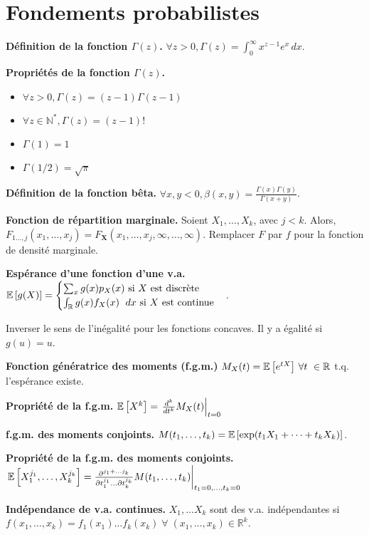\section{Fondements probabilistes}
\textbf{Définition de la fonction $\Gamma(z)$.} $\forall z > 0, \Gamma(z) = \int_0^\infty x^{z-1}e^x \, dx$.

\textbf{Propriétés de la fonction $\Gamma(z)$.}
\begin{itemize}
	\item $\forall z > 0, \Gamma(z) = (z-1)\Gamma(z-1)$
	\item $\forall z \in \mathbb{N}^*, \Gamma(z) = (z-1)!$
	\item $\Gamma(1)=1$
	\item $\Gamma(1/2)=\sqrt{\pi}$
\end{itemize}

\textbf{Définition de la fonction bêta.}  $\forall x,y<0, \beta(x,y)=\frac{\Gamma(x)\Gamma(y)}{\Gamma(x+y)}$.

\textbf{Fonction de répartition marginale.} Soient $X_1, \dots, X_k$, avec $j<k$. Alors, $F_{1\dots,j}(x_1,\dots,x_j) = F_{\mathbf{X}}(x_1,\dots,x_j,\infty, \dots, \infty).$ Remplacer $F$ par $f$ pour la fonction de densité marginale.

\textbf{Espérance d'une fonction d'une v.a.} $\e{g(X)} = 
	\begin{cases}
		\sum_x g(x) p_X(x) \text{ si $X$ est discrète} \\
		\int_\mathbb{R} g(x) f_X(x) \; dx \text{ si $X$ est continue}
	\end{cases}
$.

 Inverser le sens de l'inégalité pour les fonctions concaves. Il y a égalité si $g(u)=u$.


\textbf{Fonction génératrice des moments (f.g.m.)} $M_X(t)=\e{e^{tX}} \, \forall t \in \mathbb{R}$ t.q. l'espérance existe.

\textbf{Propriété de la f.g.m.} $\mathbb{E}\left[{X^k}\right] = \left.\frac{d^k}{dt^k}M_X(t)\right|_{t=0}$

\textbf{f.g.m. des moments conjoints.} $M(t_1,\dots,t_k) = \mathbb{E}\left[{\exp(t_1X_1+\dots+t_kX_k)}\right]$.

\textbf{Propriété de la f.g.m. des moments conjoints.} $\left. \mathbb{E}\left[{X_1^{j_1}, \dots, X_k^{j_k}}\right] = \frac{\partial^{j_1+\dots j_k}}{\partial t_1^{j_1} \dots \partial t_k^{j_k}} M(t_1,\dots,t_k) \right|_{t_1=0,\dots,t_k=0}$

\textbf{Indépendance de v.a. continues.} $X_1, \dots X_k$ sont des v.a. indépendantes si $f(x_1, \dots, x_k)=f_1(x_1)\dots f_k(x_k) \; \forall \; (x_1,\dots,x_k) \in \mathbb{R}^k$.

